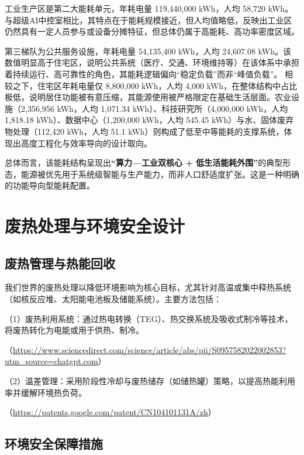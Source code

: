 工业生产区是第二大能耗单元，年耗电量 119,440,000 kWh，人均 58,720 kWh。与超级AI中控室相比，其特点在于能耗规模接近，但人均值略低，反映出工业区仍然具有一定人员参与或设备分摊特征，但总体仍属于高能耗、高功率密度区域。

第三梯队为公共服务设施，年耗电量 54,135,400 kWh，人均 24,607.08 kWh。该数值明显高于住宅区，说明公共系统（医疗、交通、环境维持等）在该体系中承担着持续运行、高可靠性的角色，其能耗逻辑偏向``稳定负载''而非``峰值负载''。 相较之下，住宅区年耗电量仅 8,800,000 kWh，人均 4,000 kWh，在整体结构中占比极低，说明居住功能被有意压缩，其能源使用被严格限定在基础生活层面。农业设施（2,356,956 kWh，人均 1,071.34 kWh）、科技研究所（4,000,000 kWh，人均 1,818.18 kWh）、数据中心（1,200,000 kWh，人均 545.45 kWh）与水、固体废弃物处理（112,420 kWh，人均 51.1 kWh）则构成了低至中等能耗的支撑系统，体现出高度工程化与效率导向的设计取向。

总体而言，该能耗结构呈现出\textbf{``算力---工业双核心 + 低生活能耗外围''}的典型形态，能源被优先用于系统级智能与生产能力，而非人口舒适度扩张。这是一种明确的功能导向型能耗配置。

\section{废热处理与环境安全设计}\label{ux5e9fux70edux5904ux7406ux4e0eux73afux5883ux5b89ux5168ux8bbeux8ba1}

\subsection{废热管理与热能回收}\label{ux5e9fux70edux7ba1ux7406ux4e0eux70edux80fdux56deux6536}

我们世界的废热处理以降低环境影响为核心目标，尤其针对高温或集中释热系统（如核反应堆、太阳能电池板及储能系统）。主要方法包括：

（1）废热利用系统：通过热电转换（TEG）、热交换系统及吸收式制冷等技术，将废热转化为电能或用于供热、制冷。

（\url{https://www.sciencedirect.com/science/article/abs/pii/S0957582022002853?utm\_source=chatgpt.com}）

（2）温差管理：采用阶段性冷却与废热储存（如储热罐）策略，以提高热能利用率并缓解环境热负荷。

（\url{https://patents.google.com/patent/CN104101131A/zh}）

\subsection{环境安全保障措施}\label{ux73afux5883ux5b89ux5168ux4fddux969cux63aaux65bd}

